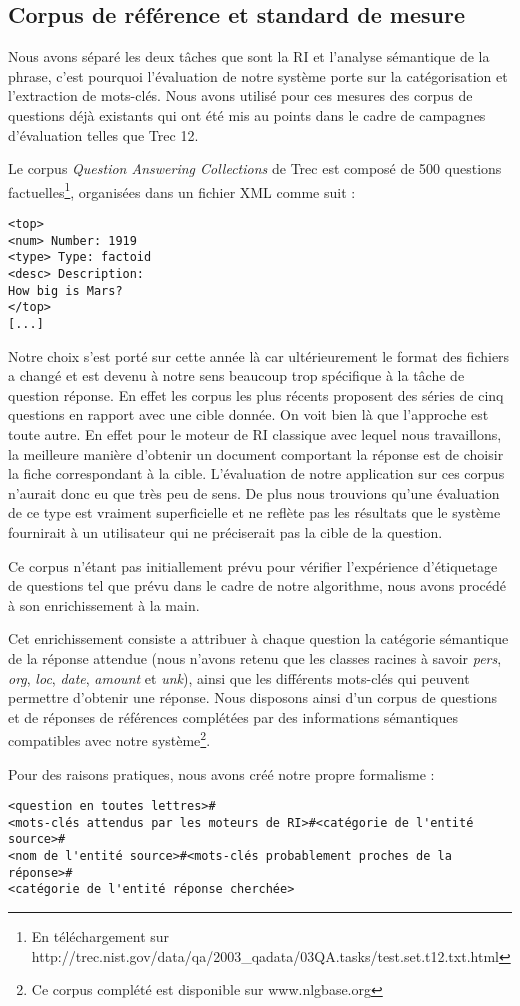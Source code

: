 \documentclass[10pt,a4paper]{article}
\begin{document}
\subsection{Corpus de référence et standard de mesure}
\par Nous avons séparé les deux tâches que sont la RI et l'analyse sémantique de la phrase, c'est pourquoi l'évaluation de notre système porte sur la catégorisation et l'extraction de mots-clés. Nous avons utilisé pour ces mesures des corpus de questions déjà existants qui ont été mis au points dans le cadre de campagnes d'évaluation telles que Trec 12. %
\par Le corpus \textit{Question Answering Collections} de Trec est composé de 500 questions factuelles\footnote{En téléchargement sur http://trec.nist.gov/data/qa/2003\_qadata/03QA.tasks/test.set.t12.txt.html}, organisées dans un fichier XML comme suit : 

\begin{verbatim}
<top>
<num> Number: 1919
<type> Type: factoid
<desc> Description:
How big is Mars?
</top>
[...]
\end{verbatim}

\par Notre choix s'est porté sur cette année là car ultérieurement le format des fichiers a changé et est devenu à notre sens beaucoup trop spécifique à la tâche de question réponse. En effet les corpus les plus récents proposent des séries de cinq questions en rapport avec une cible donnée. On voit bien là que l'approche est toute autre. En effet pour le moteur de RI classique avec lequel nous travaillons, la meilleure manière d'obtenir un document comportant la réponse est de choisir la fiche correspondant à la cible. L'évaluation de notre application sur ces corpus n'aurait donc eu que très peu de sens. De plus nous trouvions qu'une évaluation de ce type est vraiment superficielle et ne reflète pas les résultats que le système fournirait à un utilisateur qui ne préciserait pas la cible de la question. 
\par Ce corpus n'étant pas initiallement prévu pour vérifier l'expérience d'étiquetage de questions tel que prévu dans le cadre de notre algorithme, nous avons procédé à son enrichissement \og{}à la main\fg{}.
\par Cet enrichissement consiste a attribuer à chaque question la catégorie sémantique de la réponse attendue (nous n'avons retenu que les classes racines à savoir \emph{pers}, \emph{org}, \emph{loc}, \emph{date}, \emph{amount} et \emph{unk}), ainsi que les différents mots-clés qui peuvent permettre d'obtenir une réponse. Nous disposons ainsi d'un corpus de questions et de réponses de références complétées par des informations sémantiques compatibles avec notre système\footnote{Ce corpus complété est disponible sur www.nlgbase.org}. 
\par Pour des raisons pratiques, nous avons créé notre propre formalisme :
\begin{verbatim}
<question en toutes lettres>#
<mots-clés attendus par les moteurs de RI>#<catégorie de l'entité source>#
<nom de l'entité source>#<mots-clés probablement proches de la réponse>#
<catégorie de l'entité réponse cherchée> 
\end{verbatim}
\end{document}
